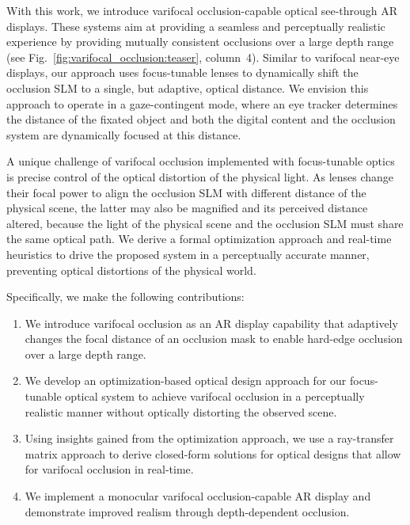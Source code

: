 With this work, we introduce varifocal occlusion-capable optical see-through AR displays. These systems aim at providing a seamless and perceptually realistic experience by providing mutually consistent occlusions over a large depth range (see Fig.~\ref{fig:varifocal_occlusion:teaser}, column~4). Similar to varifocal near-eye displays, our approach uses focus-tunable lenses to dynamically shift the occlusion SLM to a single, but adaptive, optical distance. We envision this approach to operate in a gaze-contingent mode, where an eye tracker determines the distance of the fixated object and both the digital content and the occlusion system are dynamically focused at this distance. 

A unique challenge of varifocal occlusion implemented with focus-tunable optics is precise control of the optical distortion of the physical light. As lenses change their focal power to align the occlusion SLM with different distance of the physical scene, the latter may also be magnified and its perceived distance altered, because the light of the physical scene and the occlusion SLM must share the same optical path. We derive a formal optimization approach and real-time heuristics to drive the proposed system in a perceptually accurate manner, preventing optical distortions of the physical world. 

Specifically, we make the following contributions:
%
\begin{enumerate}
\item We introduce varifocal occlusion as an AR display capability that adaptively changes the focal distance of an occlusion mask to enable hard-edge occlusion over a large depth range. 
\item  We develop an optimization-based optical design approach for our focus-tunable optical system to achieve varifocal occlusion in a perceptually realistic manner without optically distorting the observed scene. 
\item Using insights gained from the optimization approach, we use a ray-transfer matrix approach to derive closed-form solutions for optical designs that allow for varifocal occlusion in real-time.
\item We implement a monocular varifocal occlusion-capable AR display and demonstrate improved realism through depth-dependent occlusion.
\end{enumerate}



